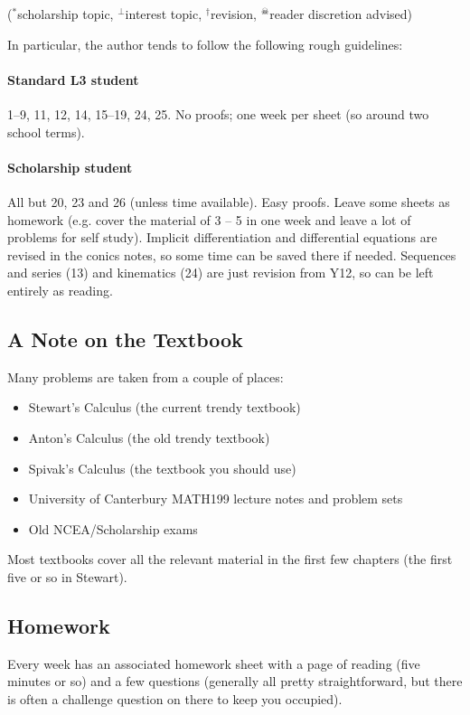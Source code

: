 ($^*$scholarship topic, $^\perp$interest topic, $^\dagger$revision, $^\skull$reader discretion advised)

In particular, the author tends to follow the following rough guidelines:

\paragraph{Standard L3 student}
1--9, 11, 12, 14, 15--19, 24, 25. No proofs; one week per sheet (so around two school terms).

\paragraph{Scholarship student}
All but 20, 23 and 26 (unless time available). Easy proofs. Leave some sheets as homework (e.g. cover the material of 3 -- 5 in one week and
leave a lot of problems for self study). Implicit differentiation and differential equations are revised in the conics notes, so some time
can be saved there if needed. Sequences and series (13) and kinematics (24) are just revision from Y12, so can be left entirely as reading.

\subsection*{A Note on the Textbook}
Many problems are taken from a couple of places:
\begin{itemize}
  \item Stewart's Calculus (the current trendy textbook)
  \item Anton's Calculus (the old trendy textbook)
  \item Spivak's Calculus (the textbook you should use)
  \item University of Canterbury MATH199 lecture notes and problem sets
  \item Old NCEA/Scholarship exams
\end{itemize}
Most textbooks cover all the relevant material in the first few chapters (the first five or so in Stewart).

\subsection*{Homework}
Every week has an associated homework sheet with a page of reading (five minutes or so) and a few questions (generally all
pretty straightforward, but there is often a challenge question on there to keep you occupied).

